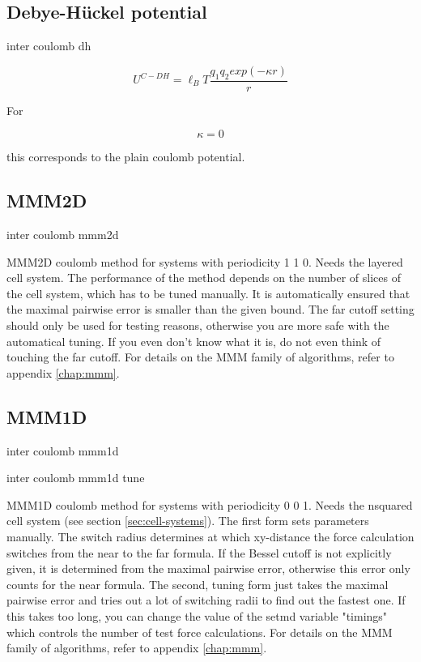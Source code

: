 \subsection{Debye-H\"uckel potential}

\begin{essyntax}
  inter coulomb dh  
\end{essyntax}
\[ U^{C-DH} = \ell_B T \frac{q_1 q_2 exp(-\kappa r)}{r} \]

For

\[ \kappa = 0 \]

this corresponds to the plain coulomb potential.

\subsection{MMM2D}

\begin{essyntax}
 inter coulomb mmm2d  
\end{essyntax}
MMM2D coulomb method for systems with periodicity 1 1 0. Needs the
layered cell system. The performance of the method depends on the
number of slices of the cell system, which has to be tuned manually.
It is automatically ensured that the maximal pairwise error is smaller
than the given bound. The far cutoff setting should only be used for
testing reasons, otherwise you are more safe with the automatical
tuning. If you even don't know what it is, do not even think of
touching the far cutoff. For details on the MMM family of algorithms,
refer to appendix \vref{chap:mmm}.

\subsection{MMM1D}

\begin{essyntax}
  inter coulomb mmm1d 
   

  inter coulomb mmm1d tune 
\end{essyntax}
MMM1D coulomb method for systems with periodicity 0 0 1. Needs the
nsquared cell system (see section \vref{sec:cell-systems}). The first
form sets parameters manually. The switch radius determines at which
xy-distance the force calculation switches from the near to the far
formula. If the Bessel cutoff is not explicitly given, it is
determined from the maximal pairwise error, otherwise this error only
counts for the near formula. The second, tuning form just takes the
maximal pairwise error and tries out a lot of switching radii to find
out the fastest one. If this takes too long, you can change the value
of the setmd variable "timings" which controls the number of test
force calculations. For details on the MMM family of algorithms,
refer to appendix \vref{chap:mmm}.

